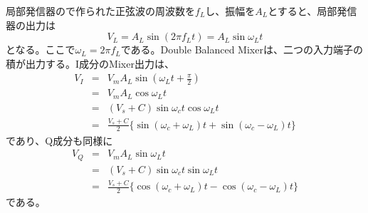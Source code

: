 局部発信器ので作られた正弦波の周波数を$f_L$し、振幅を$A_L$とすると、局部発信器の出力は
\begin{equation}
V_L = A_L \sin(2 \pi f_L t) = A_L \sin\omega_Lt
\end{equation}
となる。ここで$\omega_L = 2\pi f_L$である。Double Balanced Mixerは、二つの入力端子の積が出力する。I成分のMixer出力は、
\begin{eqnarray}
V_I &=& V_mA_L\sin(\omega_Lt + \frac{\pi}{2}) \nonumber\\
&=& V_mA_L\cos\omega_Lt \nonumber\\
&=& (V_s + C)\sin\omega_ct\cos\omega_Lt \nonumber\\
&=& \frac{V_s + C}{2}\{\sin(\omega_c + \omega_L)t + \sin(\omega_c - \omega_L)t\} \label{eq:AM_I}
\end{eqnarray}
であり、Q成分も同様に
\begin{eqnarray}
V_Q &=& V_mA_L\sin\omega_Lt \nonumber\\
&=& (V_s + C)\sin\omega_ct\sin\omega_Lt \nonumber\\
&=& \frac{V_s + C}{2}\{\cos(\omega_c + \omega_L)t - \cos(\omega_c - \omega_L)t \}\label{eq:AM_Q}
\end{eqnarray}
である。
